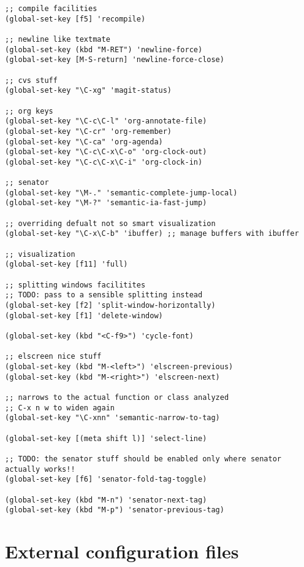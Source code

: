 \documentclass[11pt]{article}
\begin{document}
\begin{verbatim}
;; compile facilities
(global-set-key [f5] 'recompile)

;; newline like textmate
(global-set-key (kbd "M-RET") 'newline-force)
(global-set-key [M-S-return] 'newline-force-close)

;; cvs stuff
(global-set-key "\C-xg" 'magit-status)

;; org keys
(global-set-key "\C-c\C-l" 'org-annotate-file)
(global-set-key "\C-cr" 'org-remember)
(global-set-key "\C-ca" 'org-agenda)
(global-set-key "\C-c\C-x\C-o" 'org-clock-out)
(global-set-key "\C-c\C-x\C-i" 'org-clock-in)

;; senator
(global-set-key "\M-." 'semantic-complete-jump-local)
(global-set-key "\M-?" 'semantic-ia-fast-jump)

;; overriding defualt not so smart visualization
(global-set-key "\C-x\C-b" 'ibuffer) ;; manage buffers with ibuffer

;; visualization
(global-set-key [f11] 'full)

;; splitting windows facilitites
;; TODO: pass to a sensible splitting instead
(global-set-key [f2] 'split-window-horizontally)
(global-set-key [f1] 'delete-window)

(global-set-key (kbd "<C-f9>") 'cycle-font)

;; elscreen nice stuff
(global-set-key (kbd "M-<left>") 'elscreen-previous)
(global-set-key (kbd "M-<right>") 'elscreen-next)

;; narrows to the actual function or class analyzed
;; C-x n w to widen again
(global-set-key "\C-xnn" 'semantic-narrow-to-tag)

(global-set-key [(meta shift l)] 'select-line)

;; TODO: the senator stuff should be enabled only where senator actually works!!
(global-set-key [f6] 'senator-fold-tag-toggle)

(global-set-key (kbd "M-n") 'senator-next-tag)
(global-set-key (kbd "M-p") 'senator-previous-tag)
\end{verbatim}

  
\section{External configuration files}
\label{sec-43}
\end{document}

